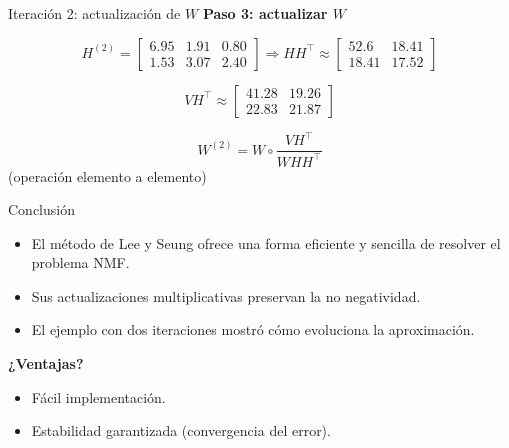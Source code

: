 \documentclass{beamer}
\begin{document}
\begin{frame}{Iteración 2: actualización de \( W \)}
\textbf{Paso 3: actualizar \( W \)}

\[
H^{(2)} =
\begin{bmatrix}
6.95 & 1.91 & 0.80 \\
1.53 & 3.07 & 2.40
\end{bmatrix}
\Rightarrow
H H^\top \approx
\begin{bmatrix}
52.6 & 18.41 \\
18.41 & 17.52
\end{bmatrix}
\]

\[
V H^\top \approx
\begin{bmatrix}
41.28 & 19.26 \\
22.83 & 21.87
\end{bmatrix}
\]

\[
W^{(2)} = W \circ \frac{V H^\top}{W H H^\top}
\]
(operación elemento a elemento)
\end{frame}

\begin{frame}{Conclusión}
\begin{itemize}
    \item El método de Lee y Seung ofrece una forma eficiente y sencilla de resolver el problema NMF.
    \item Sus actualizaciones multiplicativas preservan la no negatividad.
    \item El ejemplo con dos iteraciones mostró cómo evoluciona la aproximación.
\end{itemize}
\pause
\textbf{¿Ventajas?}
\begin{itemize}
    \item Fácil implementación.
    \item Estabilidad garantizada (convergencia del error).
\end{itemize}
\end{frame}
\end{document}
